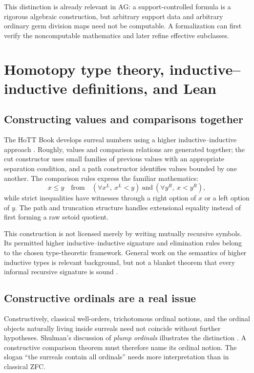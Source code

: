 \documentclass[11pt,letterpaper]{article}
\theoremstyle{definition}
\theoremstyle{remark}
\numberwithin{equation}{section}
\begin{document}
This distinction is already relevant in AG: a support-controlled formula is a rigorous algebraic construction, but arbitrary support data and arbitrary ordinary germ division maps need not be computable. A formalization can first verify the noncomputable mathematics and later refine effective subclasses.

\section{Homotopy type theory, inductive--inductive definitions, and Lean}\label{sec:hott}

\subsection{Constructing values and comparisons together}
The HoTT Book develops surreal numbers using a higher inductive--inductive approach \cite[\S11.6]{HoTTBook}. Roughly, values and comparison relations are generated together; the cut constructor uses small families of previous values with an appropriate separation condition, and a path constructor identifies values bounded by one another. The comparison rules express the familiar mathematics:
\[
 x\le y\quad\text{from}\quad
 (\forall x^L,\ x^L<y)\ \text{and}\ (\forall y^R,\ x<y^R),
\]
while strict inequalities have witnesses through a right option of \(x\) or a left option of \(y\). The path and truncation structure handles extensional equality instead of first forming a raw setoid quotient.

This construction is not licensed merely by writing mutually recursive symbols. Its permitted higher inductive--inductive signature and elimination rules belong to the chosen type-theoretic framework. General work on the semantics of higher inductive types is relevant background, but not a blanket theorem that every informal recursive signature is sound \cite{LumsdaineShulman}.

\subsection{Constructive ordinals are a real issue}
Constructively, classical well-orders, trichotomous ordinal notions, and the ordinal objects naturally living inside surreals need not coincide without further hypotheses. Shulman's discussion of \emph{plump ordinals} illustrates the distinction \cite{ShulmanPlump}. A constructive comparison theorem must therefore name its ordinal notion. The slogan ``the surreals contain all ordinals'' needs more interpretation than in classical ZFC.
\end{document}
